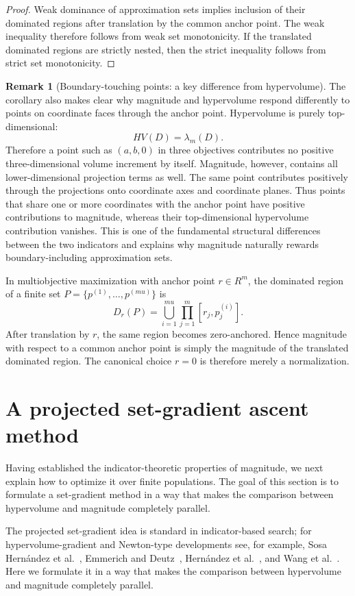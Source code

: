 \documentclass{article}
\def\mu{mu}%
\def\HV{HV}%
\def\R{R}%
\theoremstyle{definition}
\newtheorem{remark}[theorem]{Remark}
\newcommand{\HV}{\operatorname{HV}}
\newcommand{\R}{\mathbb{R}}
\newcommand{\1}{\mathbf{1}}
\begin{document}
\begin{proof}
Weak dominance of approximation sets implies inclusion of their dominated regions after translation by the common anchor point. The weak inequality therefore follows from weak set monotonicity. If the translated dominated regions are strictly nested, then the strict inequality follows from strict set monotonicity.
\end{proof}

\begin{remark}[Boundary-touching points: a key difference from hypervolume]
The corollary also makes clear why magnitude and hypervolume respond differently to points on coordinate faces through the anchor point. Hypervolume is purely top-dimensional:
\[
\HV(D)=\lambda_m(D).
\]
Therefore a point such as $(a,b,0)$ in three objectives contributes no positive three-dimensional volume increment by itself. Magnitude, however, contains all lower-dimensional projection terms as well. The same point contributes positively through the projections onto coordinate axes and coordinate planes. Thus points that share one or more coordinates with the anchor point have positive contributions to magnitude, whereas their top-dimensional hypervolume contribution vanishes. This is one of the fundamental structural differences between the two indicators and explains why magnitude naturally rewards boundary-including approximation sets.
\end{remark}

In multiobjective maximization with anchor point $r\in\R^m$, the dominated region of a finite set $P=\{p^{(1)},\dots,p^{(\mu)}\}$ is
\[
D_r(P)=\bigcup_{i=1}^{\mu} \prod_{j=1}^m [r_j,p^{(i)}_j].
\]
After translation by $r$, the same region becomes zero-anchored. Hence magnitude with respect to a common anchor point is simply the magnitude of the translated dominated region. The canonical choice $r=0$ is therefore merely a normalization.


\section{A projected set-gradient ascent method}

Having established the indicator-theoretic properties of magnitude, we next explain how to optimize it over finite populations. The goal of this section is to formulate a set-gradient method in a way that makes the comparison between hypervolume and magnitude completely parallel.

The projected set-gradient idea is standard in indicator-based search; for hypervolume-gradient and Newton-type developments see, for example, Sosa Hernández et al.~\cite{SosaHernandezSchuetzeEmmerich2014}, Emmerich and Deutz~\cite{EmmerichDeutz2014}, Hernández et al.~\cite{HernandezSchuetzeWangDeutzEmmerich2018}, and Wang et al.~\cite{WangDeutzBackEmmerich2017}. Here we formulate it in a way that makes the comparison between hypervolume and magnitude completely parallel.
\end{document}
